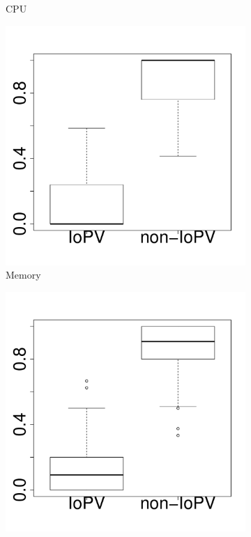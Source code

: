 \documentclass[10pt,journal,compsoc]{IEEEtran}
\begin{document}
\begin{figure}[t]
\begin{subfigure}{0.19\textwidth}
                \caption{CPU}
        \end{subfigure}%
        \begin{subfigure}{0.19\textwidth}
                \includegraphics[width=\linewidth]{Figures/mem-hadoop-boxplot.pdf}
                \caption{Memory}
        \end{subfigure}%
        \begin{subfigure}{0.19\textwidth}
                \includegraphics[width=\linewidth]{Figures/ioread-hadoop-boxplot.pdf}

\end{subfigure}
\end{figure}
\end{document}
